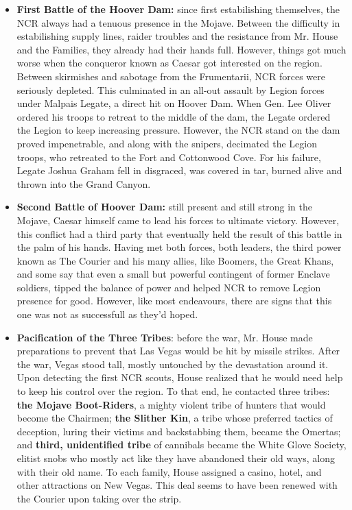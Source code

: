 \documentclass[11pt]{article} %
\begin{document}
\begin{itemize}
	\item \textbf{First Battle of the Hoover Dam:} since first estabilishing themselves, the NCR always had a tenuous presence in the Mojave. Between the difficulty in estabilishing supply lines, raider troubles and the resistance from Mr. House and the Families, they already had their hands full. However, things got much worse when the conqueror known as Caesar got interested on the region. Between skirmishes and sabotage from the Frumentarii, NCR forces were seriously depleted. This culminated in an all-out assault by Legion forces under Malpais Legate, a direct hit on Hoover Dam. When Gen. Lee Oliver ordered his troops to retreat to the middle of the dam, the Legate ordered the Legion to keep increasing pressure. However, the NCR stand on the dam proved impenetrable, and along with the snipers, decimated the Legion troops, who retreated to the Fort and Cottonwood Cove. For his failure, Legate Joshua Graham fell in disgraced, was covered in tar, burned alive and thrown into the Grand Canyon. 
	
	\item \textbf{Second Battle of Hoover Dam:} still present and still strong in the Mojave, Caesar himself came to lead his forces to ultimate victory. However, this conflict had a third party that eventually held the result of this battle in the palm of his hands. Having met both forces, both leaders, the third power known as The Courier and his many allies, like Boomers, the Great Khans, and some say that even a small but powerful contingent of former Enclave soldiers, tipped the balance of power and helped NCR to remove Legion presence for good. However, like most endeavours, there are signs that this one was not as successfull as they'd hoped.
	
	\item \textbf{Pacification of the Three Tribes}: before the war, Mr. House made preparations to prevent that Las Vegas would be hit by missile strikes. After the war, Vegas stood tall, mostly untouched by the devastation around it. Upon detecting the first NCR scouts, House realized that he would need help to keep his control over the region. To that end, he contacted three tribes: \textbf{the Mojave Boot-Riders}, a mighty violent tribe of hunters that would become the Chairmen; \textbf{the Slither Kin}, a tribe whose preferred tactics of deception, luring their victims and backstabbing them, became the Omertas; and \textbf{third, unidentified tribe} of cannibals became the White Glove Society, elitist snobs who mostly act like they have abandoned their old ways, along with their old name. To each family, House assigned a casino, hotel, and other attractions on New Vegas. This deal seems to have been renewed with the Courier upon taking over the strip.
	

\end{itemize}
\end{document}
